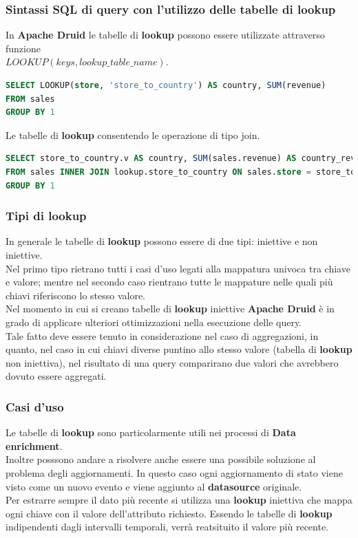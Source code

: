 \documentclass{article}
\begin{document}
\subsubsection{Sintassi SQL di query con l'utilizzo delle tabelle di lookup}
In \textbf{Apache Druid} le tabelle di \textbf{lookup} possono essere utilizzate attraverso funzione\\ $LOOKUP(keys,lookup\_table\_name)$.
\begin{lstlisting}[language=SQL,showstringspaces=false,]
SELECT LOOKUP(store, 'store_to_country') AS country, SUM(revenue)
FROM sales
GROUP BY 1
\end{lstlisting}
Le tabelle di \textbf{lookup} consentendo le operazione di tipo join.
\begin{lstlisting}[language=SQL,showstringspaces=false,]
SELECT store_to_country.v AS country, SUM(sales.revenue) AS country_revenue
FROM sales INNER JOIN lookup.store_to_country ON sales.store = store_to_country.k
GROUP BY 1
\end{lstlisting}
\subsubsection{Tipi di lookup}
In generale le tabelle di \textbf{lookup} possono essere di due tipi: iniettive e non iniettive. \\
Nel primo tipo rietrano tutti i casi d'uso legati alla mappatura univoca tra chiave e valore; mentre nel secondo caso rientrano tutte le mappature nelle quali più chiavi riferiscono lo stesso valore.\\
Nel momento in cui si creano tabelle di \textbf{lookup} iniettive \textbf{Apache Druid} è in grado di applicare ulteriori ottimizzazioni nella esecuzione delle query.
\\Tale fatto deve essere tenuto in considerazione nel caso di aggregazioni, in quanto, nel caso in cui chiavi diverse puntino allo stesso valore (tabella di \textbf{lookup} non iniettiva), nel risultato di una query comparirano due valori che avrebbero dovuto essere aggregati.
\subsubsection{Casi d'uso}
Le tabelle di \textbf{lookup} sono particolarmente utili nei processi di \textbf{Data enrichment}.\\
Inoltre posssono andare a risolvere anche essere una possibile soluzione al problema degli aggiornamenti. In questo caso ogni aggiornamento di stato viene visto come un nuovo evento e viene aggiunto al \textbf{datasource} originale.\\
Per estrarre sempre il dato più recente si utilizza una \textbf{lookup} iniettiva che mappa ogni chiave con il valore dell'attributo richiesto. Essendo le tabelle di \textbf{lookup} indipendenti dagli intervalli temporali, verrà reatsituito il valore più recente. 
\end{document}
